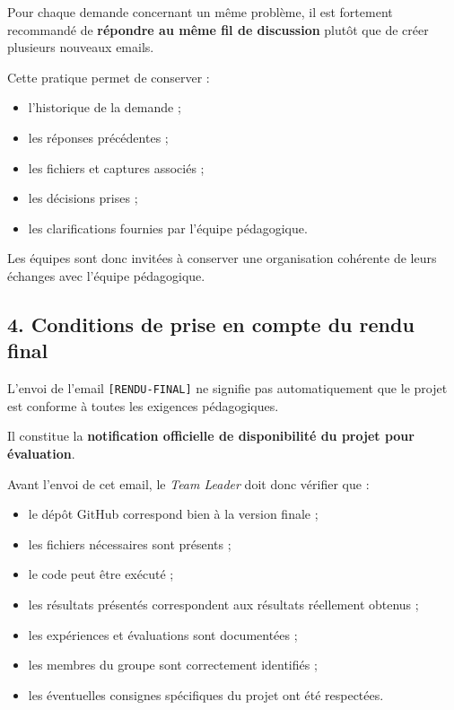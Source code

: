 \documentclass[11pt,a4paper]{article}
\begin{document}
\begin{tcolorbox}[
    colback=sintefblue!8,
    colframe=sintefblue,
    title=\textbf{DIRECTIVES OFFICIELLES DE COMMUNICATION, DE SUIVI ET DE RENDU},
    arc=2mm,
    boxrule=0.8pt,
    breakable
]
Pour chaque demande concernant un même problème, il est fortement recommandé
de \textbf{répondre au même fil de discussion} plutôt que de créer plusieurs
nouveaux emails.

Cette pratique permet de conserver :

\begin{itemize}
    \item l'historique de la demande ;
    \item les réponses précédentes ;
    \item les fichiers et captures associés ;
    \item les décisions prises ;
    \item les clarifications fournies par l'équipe pédagogique.
\end{itemize}

Les équipes sont donc invitées à conserver une organisation cohérente de leurs
échanges avec l'équipe pédagogique.

\subsection*{4. Conditions de prise en compte du rendu final}

L'envoi de l'email \texttt{[RENDU-FINAL]} ne signifie pas automatiquement que
le projet est conforme à toutes les exigences pédagogiques.

Il constitue la \textbf{notification officielle de disponibilité du projet
pour évaluation}.

Avant l'envoi de cet email, le \textit{Team Leader} doit donc vérifier que :

\begin{itemize}
    \item le dépôt GitHub correspond bien à la version finale ;
    \item les fichiers nécessaires sont présents ;
    \item le code peut être exécuté ;
    \item les résultats présentés correspondent aux résultats réellement obtenus ;
    \item les expériences et évaluations sont documentées ;
    \item les membres du groupe sont correctement identifiés ;
    \item les éventuelles consignes spécifiques du projet ont été respectées.
\end{itemize}


\end{tcolorbox}
\end{document}
